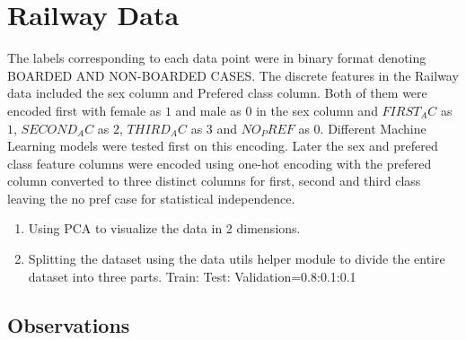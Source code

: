 \documentclass[12pt,journal,compsoc]{IEEEtran}
\begin{document}
\section{Railway Data}
\noindent The labels corresponding to each data point were in binary format denoting BOARDED AND NON-BOARDED CASES. The discrete features in the Railway data included the sex column and Prefered class column. Both of them were encoded first with female as $1$ and male as $0$ in the sex column and $FIRST_AC$ as $1$, $SECOND_AC$ as $2$, $THIRD_AC$ as $3$ and $NO_PREF$ as $0$. Different Machine Learning models were tested first on this encoding. Later the sex and prefered class feature columns were encoded using one-hot encoding with the prefered column converted to three distinct columns for first, second and third class leaving the no pref case for statistical independence. 

\begin{enumerate}
\item Using PCA to visualize the data in 2 dimensions.

\item Splitting the dataset using the data utils helper module to divide the entire dataset into three parts. Train: Test: Validation=0.8:0.1:0.1

\end{enumerate}
\pagebreak
\subsection{Observations}
\end{document}
